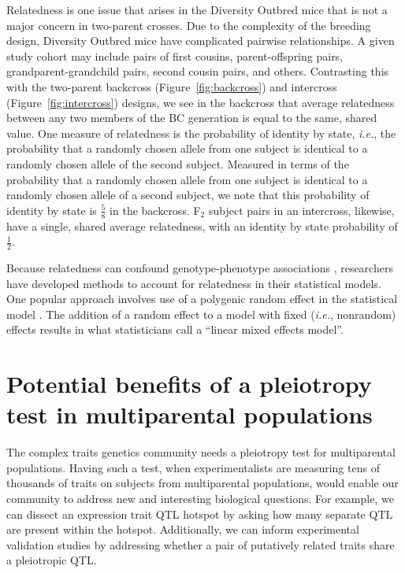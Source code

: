 \documentclass[oneside]{book}\usepackage[]{graphicx}\usepackage[]{color}
\begin{document}
Relatedness is one issue that arises in the Diversity Outbred mice that is not a major concern in 
two-parent crosses. Due to the complexity of the breeding design, Diversity Outbred mice
have 
complicated pairwise relationships. A given study cohort may include pairs of first
cousins, parent-offspring pairs, grandparent-grandchild pairs, second cousin pairs, and others.
Contrasting this with the two-parent backcross (Figure~\ref{fig:backcross}) and
intercross (Figure~\ref{fig:intercross}) designs, we see in the backcross that
average relatedness between any two members of the BC generation is equal to the same, shared value.
One measure of relatedness is the probability of identity by state, \emph{i.e.}, the
probability that a randomly chosen allele from one subject is identical to a randomly chosen
allele of the second subject. Measured in terms of the probability that a randomly chosen allele
from one subject is identical to a randomly chosen allele of a second subject, we note that
this probability of identity by state is $\frac{5}{8}$ in the backcross. F$_2$ subject pairs in an intercross, likewise, have a single, shared average relatedness, with an identity by state probability of $\frac{1}{2}$.

Because relatedness can confound genotype-phenotype associations 
\citep{yang2014advantages}, researchers have developed methods to account 
for relatedness in their statistical models. One popular approach involves 
use of a polygenic random effect in the statistical model \citep{kang2008efficient}.
The addition of a random effect to a model with fixed (\emph{i.e.}, nonrandom)
effects results in what statisticians call a ``linear mixed effects model''. 


\section{Potential benefits of a pleiotropy test in multiparental populations}\label{sec:pleiotropy-mpp}

The complex traits genetics community needs a pleiotropy test for
multiparental populations. Having such a test, when experimentalists are
measuring tens of thousands of traits on subjects from multiparental populations,
would enable our community to address new and interesting biological questions.
For example, we can dissect an expression trait QTL hotspot by asking how many
separate QTL are present within the hotspot. Additionally, we can inform experimental
validation studies by addressing whether a pair of putatively related traits share a
pleiotropic QTL.
\end{document}
